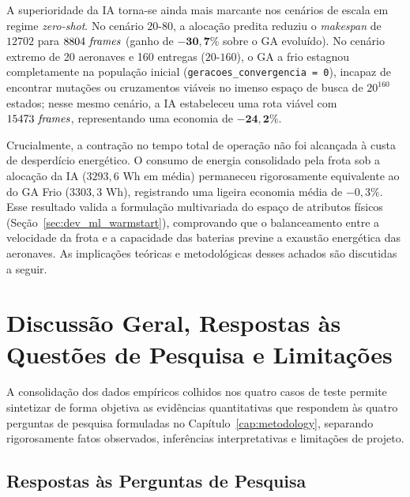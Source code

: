 A superioridade da IA torna-se ainda mais marcante nos cenários de escala em regime \textit{zero-shot}. No cenário $20\text{-}80$, a alocação predita reduziu o \textit{makespan} de $12702$ para $8804\text{ \textit{frames}}$ (ganho de $\mathbf{-30{,}7\%}$ sobre o GA evoluído). No cenário extremo de 20 aeronaves e 160 entregas ($20\text{-}160$), o GA a frio estagnou completamente na população inicial (\texttt{geracoes\_convergencia = 0}), incapaz de encontrar mutações ou cruzamentos viáveis no imenso espaço de busca de $20^{160}$ estados; nesse mesmo cenário, a IA estabeleceu uma rota viável com $15473\text{ \textit{frames}}$, representando uma economia de $\mathbf{-24{,}2\%}$.

Crucialmente, a contração no tempo total de operação não foi alcançada à custa de desperdício energético. O consumo de energia consolidado pela frota sob a alocação da IA ($3293{,}6\text{ Wh}$ em média) permaneceu rigorosamente equivalente ao do GA Frio ($3303{,}3\text{ Wh}$), registrando uma ligeira economia média de $-0{,}3\%$. Esse resultado valida a formulação multivariada do espaço de atributos físicos (Seção~\ref{sec:dev_ml_warmstart}), comprovando que o balanceamento entre a velocidade da frota e a capacidade das baterias previne a exaustão energética das aeronaves. As implicações teóricas e metodológicas desses achados são discutidas a seguir.

\section{Discussão Geral, Respostas às Questões de Pesquisa e Limitações}\label{sec:discussao_geral}

A consolidação dos dados empíricos colhidos nos quatro casos de teste permite sintetizar de forma objetiva as evidências quantitativas que respondem às quatro perguntas de pesquisa formuladas no Capítulo~\ref{cap:metodology}, separando rigorosamente fatos observados, inferências interpretativas e limitações de projeto.

\subsection{Respostas às Perguntas de Pesquisa}

